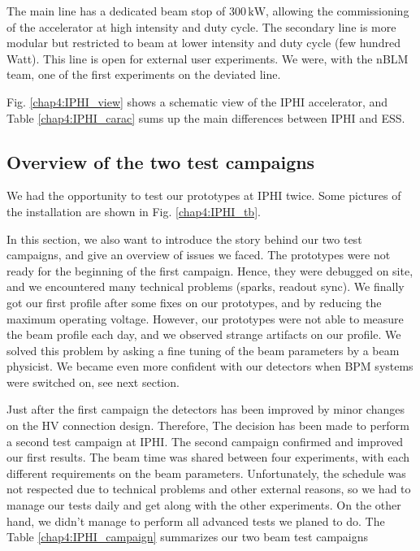 \begin{refsection}
  

  The main line has a dedicated beam stop of $300\,\mathrm{kW}$, allowing the commissioning of the accelerator at high intensity and duty cycle.
  The secondary line is more modular but restricted to beam at lower intensity and duty cycle (few hundred Watt).
  This line is open for external user experiments.
  We were, with the nBLM team, one of the first experiments on the deviated line\cite{Senee:IPAC2018-TUPAF016}.

  Fig. \ref{chap4:IPHI_view} shows a schematic view of the IPHI accelerator, and Table \ref{chap4:IPHI_carac} sums up the main differences between IPHI and ESS.
  

  \subsection{Overview of the two test campaigns}
  We had the opportunity to test our prototypes at IPHI twice.
  Some pictures of the installation are shown in Fig. \ref{chap4:IPHI_tb}.
  

  In this section, we also want to introduce the story behind our two test campaigns, and give an overview of issues we faced.
  The prototypes were not ready for the beginning of the first campaign.
  Hence, they were debugged on site, and we encountered many technical problems (sparks, readout sync).
  We finally got our first profile after some fixes on our prototypes, and by reducing the maximum operating voltage.
  However, our prototypes were not able to measure the beam profile each day, and we observed strange artifacts on our profile.
  We solved this problem by asking a fine tuning of the beam parameters by a beam physicist.
  We became even more confident with our detectors when BPM systems were switched on, see next section.

  Just after the first campaign the detectors has been improved by minor changes on the HV connection design. Therefore, The decision has been made to perform a second test campaign at IPHI.
  The second campaign confirmed and improved our first results.
  The beam time was shared between four experiments, with each different requirements on the beam parameters.
  Unfortunately, the schedule was not respected due to technical problems and other external reasons, so
  we had to manage our tests daily and get along with the other experiments.
  On the other hand, we didn't manage to perform all advanced tests we planed to do.
  The Table \ref{chap4:IPHI_campaign} summarizes our two beam test campaigns


\end{refsection}
